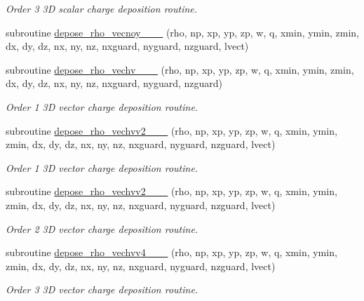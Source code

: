 \begin{DoxyCompactItemize}
\begin{DoxyCompactList}\small\item\em Order 3 3D scalar charge deposition routine. \end{DoxyCompactList}\item 
subroutine \hyperlink{charge__deposition_8_f90_a570a05e74c2ed2a6fb9f9bf851e68390}{depose\+\_\+rho\+\_\+vecnoy\+\_\+\_\+\_} (rho, np, xp, yp, zp, w, q, xmin, ymin, zmin, dx, dy, dz, nx, ny, nz, nxguard, nyguard, nzguard, lvect)
\item 
subroutine \hyperlink{charge__deposition_8_f90_a9c1d09d89c39bd299a3b894dd419a9c6}{depose\+\_\+rho\+\_\+vechv\+\_\+\_\+\_} (rho, np, xp, yp, zp, w, q, xmin, ymin, zmin, dx, dy, dz, nx, ny, nz, nxguard, nyguard, nzguard)
\begin{DoxyCompactList}\small\item\em Order 1 3D vector charge deposition routine. \end{DoxyCompactList}\item 
subroutine \hyperlink{charge__deposition_8_f90_a66c87ccc669ef28ae7e636d8b39e050a}{depose\+\_\+rho\+\_\+vechvv2\+\_\+\_\+\_} (rho, np, xp, yp, zp, w, q, xmin, ymin, zmin, dx, dy, dz, nx, ny, nz,                                   nxguard, nyguard, nzguard, lvect)
\begin{DoxyCompactList}\small\item\em Order 1 3D vector charge deposition routine. \end{DoxyCompactList}\item 
subroutine \hyperlink{charge__deposition_8_f90_a618d3787267c54578f40d084c4d915e3}{depose\+\_\+rho\+\_\+vechvv2\+\_\+\_\+\_} (rho, np, xp, yp, zp, w, q, xmin, ymin, zmin, dx, dy, dz, nx, ny, nz, nxguard, nyguard, nzguard, lvect)
\begin{DoxyCompactList}\small\item\em Order 2 3D vector charge deposition routine. \end{DoxyCompactList}\item 
subroutine \hyperlink{charge__deposition_8_f90_a55f64905a5f5c387baef1cdddfc060f7}{depose\+\_\+rho\+\_\+vechvv4\+\_\+\_\+\_} (rho, np, xp, yp, zp, w, q, xmin, ymin, zmin, dx, dy, dz, nx, ny, nz, nxguard, nyguard, nzguard, lvect)
\begin{DoxyCompactList}\small\item\em Order 3 3D vector charge deposition routine. \end{DoxyCompactList}\item 

\end{DoxyCompactItemize}
